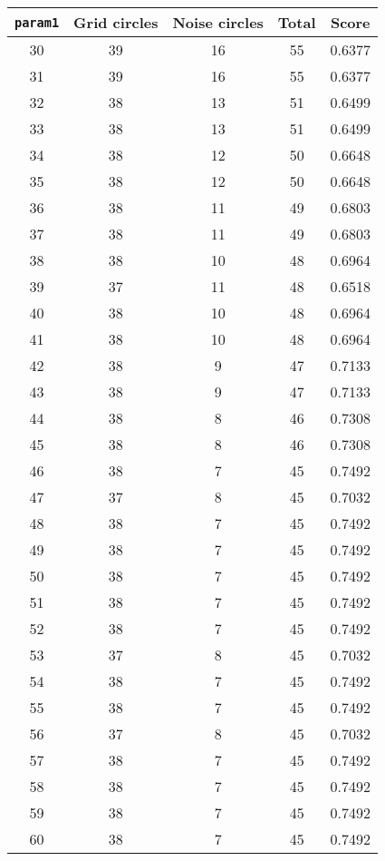 \documentclass[letterpaper, 12pt]{article}
\begin{document}
\begin{longtable}{|c|c|c|c|c|}
\hline
\textbf{\texttt{param1}} & \textbf{Grid circles} & \textbf{Noise circles} & \textbf{Total} & \textbf{Score} \\
\hline
30 & 39 & 16 & 55 & 0.6377 \\
\hline
31 & 39 & 16 & 55 & 0.6377 \\
\hline
32 & 38 & 13 & 51 & 0.6499 \\
\hline
33 & 38 & 13 & 51 & 0.6499 \\
\hline
34 & 38 & 12 & 50 & 0.6648 \\
\hline
35 & 38 & 12 & 50 & 0.6648 \\
\hline
36 & 38 & 11 & 49 & 0.6803 \\
\hline
37 & 38 & 11 & 49 & 0.6803 \\
\hline
38 & 38 & 10 & 48 & 0.6964 \\
\hline
39 & 37 & 11 & 48 & 0.6518 \\
\hline
40 & 38 & 10 & 48 & 0.6964 \\
\hline
41 & 38 & 10 & 48 & 0.6964 \\
\hline
42 & 38 & 9 & 47 & 0.7133 \\
\hline
43 & 38 & 9 & 47 & 0.7133 \\
\hline
44 & 38 & 8 & 46 & 0.7308 \\
\hline
45 & 38 & 8 & 46 & 0.7308 \\
\hline
46 & 38 & 7 & 45 & 0.7492 \\
\hline
47 & 37 & 8 & 45 & 0.7032 \\
\hline
48 & 38 & 7 & 45 & 0.7492 \\
\hline
49 & 38 & 7 & 45 & 0.7492 \\
\hline
50 & 38 & 7 & 45 & 0.7492 \\
\hline
51 & 38 & 7 & 45 & 0.7492 \\
\hline
52 & 38 & 7 & 45 & 0.7492 \\
\hline
53 & 37 & 8 & 45 & 0.7032 \\
\hline
54 & 38 & 7 & 45 & 0.7492 \\
\hline
55 & 38 & 7 & 45 & 0.7492 \\
\hline
56 & 37 & 8 & 45 & 0.7032 \\
\hline
57 & 38 & 7 & 45 & 0.7492 \\
\hline
58 & 38 & 7 & 45 & 0.7492 \\
\hline
59 & 38 & 7 & 45 & 0.7492 \\
\hline
60 & 38 & 7 & 45 & 0.7492 \\
\hline

\end{longtable}
\end{document}
